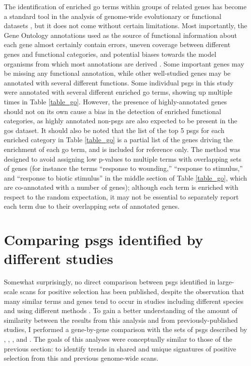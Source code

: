 The identification of enriched \ac{go} terms within groups of related
genes has become a standard tool in the analysis of genome-wide
evolutionary or functional datasets \citep{Khatri2012}, but it does
not come without certain limitations. Most importantly, the Gene
Ontology annotations used as the source of functional information
about each gene almost certainly contain errors, uneven coverage
between different genes and functional categories, and potential
biases towards the model organisms from which most annotations are
derived \citep{Rhee2008}. Some important genes may be missing any
functional annotation, while other well-studied genes may be annotated
with several different functions. Some individual \acp{psg} in this
study were annotated with several different enriched \ac{go} terms,
showing up multiple times in Table \ref{table_go}. However, the
presence of highly-annotated genes should not on its own cause a bias
in the detection of enriched functional categories, as highly
annotated non-\acp{psg} are also expected to be present in the
\acp{go} dataset. It should also be noted that the list of the top 5
\acp{psg} for each enriched category in Table \ref{table_go} is a
partial list of the genes driving the enrichment of each \ac{go} term,
and is included for reference only. The \topgo method was designed to
avoid assigning low p-values to multiple terms with overlapping sets
of genes (for instance the terms ``response to wounding,'' ``response
to stimulus,'' and ``response to biotic stimulus'' in the middle
section of Table \ref{table_go}, which are co-annotated with a number
of genes); although each term is enriched with respect to the random
expectation, it may not be essential to separately report each term
due to their overlapping sets of annotated genes.


\section{Comparing \acp{psg} identified by different studies}

Somewhat surprisingly, no direct comparison between \acp{psg}
identified in large-scale scans for positive selection has been
published, despite the observation that many similar terms and genes
tend to occur in studies including different species and using
different methods \citep{Nielsen2005,Kosiol2008}. To gain a better
understanding of the amount of similarity between the results from
this analysis and from previously-published studies, I performed a
gene-by-gene comparison with the sets of \acp{psg} described by
\citet{Clark2003}, \citet{Nielsen2005}, \citet{Macaque2007}, and
\citet{Kosiol2008}. The goals of this analyses were conceptually
similar to those of the previous section: to identify trends in shared
and unique signatures of positive selection from this and previous
genome-wide scans.

